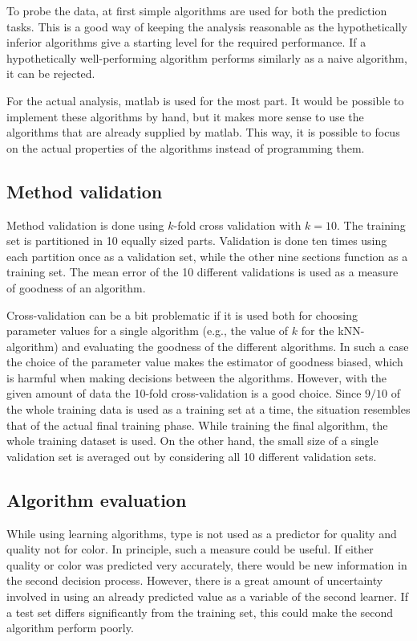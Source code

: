 \documentclass[twoside]{article}
\begin{document}
\begin{multicols}{2}
To probe the data, at first simple algorithms are used for
both the prediction tasks. This is a good way of keeping the analysis reasonable as
the hypothetically inferior algorithms give a starting level for the required performance. If a hypothetically
well-performing algorithm performs similarly as a naive algorithm, it can be rejected.

For the actual analysis, matlab is used for the most part. It would be possible to implement these algorithms by hand,
but it makes more sense to use the algorithms that are already supplied by matlab. This way, it is possible to focus
on the actual properties of the algorithms instead of programming them.

\subsection{Method validation}

Method validation is done using $k$-fold cross validation with $k = 10$. The training set is partitioned in 10 equally sized parts. 
Validation is done ten times using each partition once as a validation set, while the other nine
sections function as a training set. The mean error of the 10 different validations is used as a measure
of goodness of an algorithm.

Cross-validation can be a bit problematic if it is used both for choosing parameter values for a single algorithm (e.g., the value of $k$
for the kNN-algorithm) and evaluating the goodness of the different algorithms. In such a case the choice of the parameter value makes the estimator
of goodness biased, which is harmful when making decisions between the algorithms. However, with the given amount of data
the 10-fold cross-validation is a good choice. Since $9/10$ of the whole training data is used as a training set at a time,
the situation resembles that of the actual final training phase. While training the final algorithm, the whole training dataset
is used. On the other hand, the small size of a single validation set is averaged out by considering all 10 different validation sets.

\subsection{Algorithm evaluation}

While using learning algorithms, type is not used as a predictor for quality and quality not for color.
In principle, such a measure could be useful. If either quality or color was predicted very
accurately, there would be new information in the second decision process.
However, there is a great amount of uncertainty involved in using an already predicted value as a
variable of the second learner. If a test set differs significantly from the training set, this could
make the second algorithm perform poorly.


\end{multicols}
\end{document}

